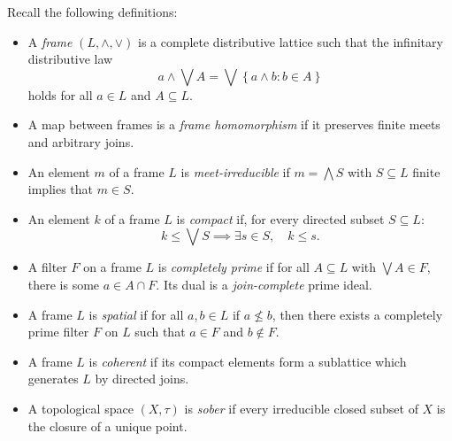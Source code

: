 \documentclass{article}
\theoremstyle{plain}
\theoremstyle{definition}
\theoremstyle{remark}
\newcommand{\bp}[1]{\left\lbrace #1 \right\rbrace}
\newcommand{\0}{\mathbbm 0}
\newcommand{\1}{\mathbbm 1}
\newcommand{\2}{\mathbbm 2}
\begin{document}
Recall the following definitions:
\begin{itemize}

\item A \emph{frame} $(L,\wedge,\vee)$ is a complete distributive lattice such that the infinitary distributive law
\[
a\wedge\bigvee A=\bigvee\bp{a\wedge b:b\in A}
\]
holds for all $a\in L$ and $A\subseteq L$.
\item A map between frames is a \emph{frame homomorphism} if it preserves finite meets and arbitrary joins.
\item  An element \(m\) of a frame \(L\) is  \emph{meet-irreducible} if \(m= \bigwedge S\) with \(S \subseteq L\) finite implies that \(m \in S\).
 \item  An element $k$ of a frame $L $ is \emph{compact} if, for every directed subset $S \subseteq L$:
\[
    k \leq \bigvee S \implies \exists s \in S, \quad k \leq s.
\]
\item
A filter $F$ on a frame $L$ is \emph{completely prime} if for all $A\subseteq L$ with $\bigvee A\in F$, there is some $a\in A\cap F$. Its dual is a \emph{join-complete} prime ideal.
\item
A frame $L$ is \emph{spatial} if for all \(a,b \in L\) if \(a \not \leq b\), then there exists a completely prime filter \(F\) on \(L\) such that \(a \in F\) and \(b \notin F\). 
\item 
A frame $L$ is \emph{coherent} if its compact elements form a sublattice which generates $L$ by directed joins. 

\item A topological space $(X,\tau)$ is  \emph{sober} if  every irreducible closed subset of $X$ is the closure of a unique point. 
   
    \end{itemize}
\end{document}
